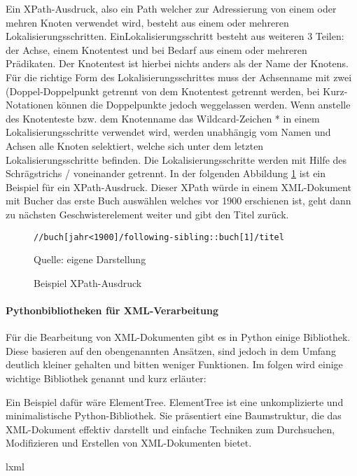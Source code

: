 Ein XPath-Ausdruck, also ein Path welcher zur Adressierung von einem oder mehren Knoten verwendet wird,
besteht aus einem oder mehreren Lokalisierungsschritten.
EinLokalisierungsschritt besteht aus weiteren 3 Teilen: der Achse, einem Knotentest und bei Bedarf aus einem oder mehreren Prädikaten.
Der Knotentest ist hierbei nichts anders als der Name der Knotens.
Für die richtige Form des Lokalisierungsschrittes muss der Achsenname mit zwei
(Doppel-Doppelpunkt getrennt von dem Knotentest getrennt werden, bei Kurz-Notationen können die Doppelpunkte jedoch weggelassen werden.
Wenn anstelle des Knotenteste bzw.
dem Knotenname das Wildcard-Zeichen * in einem Lokalisierungsschritte verwendet wird,
werden unabhängig vom Namen und Achsen alle Knoten selektiert, welche sich unter dem letzten Lokalisierungsschritte befinden.
Die Lokalisierungsschritte werden mit Hilfe des Schrägstrichs / voneinander getrennt. \cite*{XPath2025}
In der folgenden Abbildung \ref{fig: XPath-Ausdruck} ist ein Beispiel für ein XPath-Ausdruck.
Dieser XPath würde in einem XML-Dokument mit Bucher das erste Buch auswählen welches vor 1900 erschienen ist, geht dann
zu nächsten Geschwisterelement weiter und gibt den Titel zurück.


\begin{figure}[H]
\centering
\begin{minipage}{0.95\textwidth}
\begin{lstlisting}[language=XPath]
//buch[jahr<1900]/following-sibling::buch[1]/titel
\end{lstlisting}
\end{minipage}
\caption{Beispiel XPath-Ausdruck}
\label{fig: XPath-Ausdruck}
    {Quelle: eigene Darstellung}
\end{figure}


\paragraph{Pythonbibliotheken für XML-Verarbeitung}
Für die Bearbeitung von \ac{XML}-Dokumenten gibt es in Python einige Bibliothek.
Diese basieren auf den obengenannten Ansätzen, sind jedoch in dem Umfang deutlich kleiner gehalten  und bitten weniger Funktionen.
Im folgen wird einige wichtige Bibliothek genannt und kurz erläuter:

Ein Beispiel dafür wäre ElementTree.
ElementTree ist eine unkomplizierte und minimalistische Python-Bibliothek.
Sie präsentiert eine Baumstruktur, die das \ac{XML}-Dokument effektiv darstellt und einfache Techniken zum Durchsuchen,
Modifizieren und Erstellen von \ac{XML}-Dokumenten bietet.\cite*{ElementTree2025}

lxml
\pagebreak